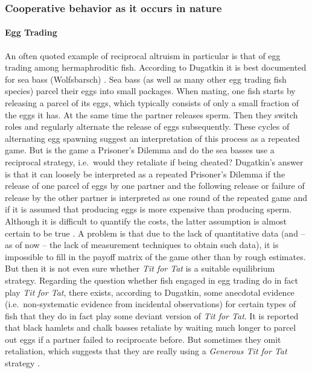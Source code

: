 \subsubsection{Cooperative behavior as it occurs in nature}

\paragraph{Egg Trading}

An often quoted example of reciprocal altruism in particular is that of egg
trading among hermaphroditic fish. According to Dugatkin it is best
documented for sea bass (Wolfsbarsch) \cite[p.\ 46]{dugatkin:1997}. Sea bass
(as well as many other egg trading fish species) parcel their eggs into small
packages. When mating, one fish starts by releasing a parcel of its eggs,
which typically consists of only a small fraction of the eggs it has. At
the same time the partner releases sperm. Then they switch roles and regularly
alternate the release of eggs subsequently. These cycles of alternating egg
spawning suggest an interpretation of this process as a repeated game. But is
the game a Prisoner's Dilemma and do the sea basses use a reciprocal strategy,
i.e.\ would they retaliate if being cheated? Dugatkin's answer is that it can
loosely be interpreted as a repeated Prisoner's Dilemma if the release of one
parcel of eggs by one partner and the following release or failure of release
by the other partner is interpreted as one round of the repeated game and if
it is assumed that producing eggs is more expensive than producing sperm.
Although it is difficult to quantify the costs, the latter assumption is
almost certain to be true \cite[p.\ 48]{dugatkin:1997}.  A problem is that due
to the lack of quantitative data (and -- as of now -- the lack of measurement
techniques to obtain such data), it is impossible to fill in the payoff matrix
of the game other than by rough estimates. But then it is not even sure
whether {\em Tit for Tat} is a suitable equilibrium strategy. Regarding the
question whether fish engaged in egg trading do in fact play {\em Tit for
  Tat}, there exists, according to Dugatkin, some anecdotal evidence (i.e.\  
non-systematic evidence from incidental observations) for certain types of fish
that they do in fact play some deviant version of {\em Tit for Tat}. It is reported
that black hamlets and chalk basses retaliate by waiting much longer to parcel
out eggs if a partner failed to reciprocate before. But sometimes they omit
retaliation, which suggests that they are really using a {\em Generous Tit for
  Tat} strategy \cite[p.\  48]{dugatkin:1997}.

